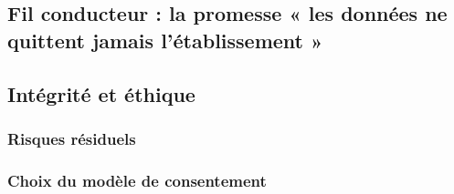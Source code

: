 
\subsection{Fil conducteur : la promesse « les données ne quittent jamais l'établissement »}
\label{sec:promesse}

\subsection{Intégrité et éthique}
\label{sec:integrite-ethique}

\subsubsection{Risques résiduels}
\label{sec:risques-residuels}

\subsubsection{Choix du modèle de consentement}
\label{sec:consentement}

